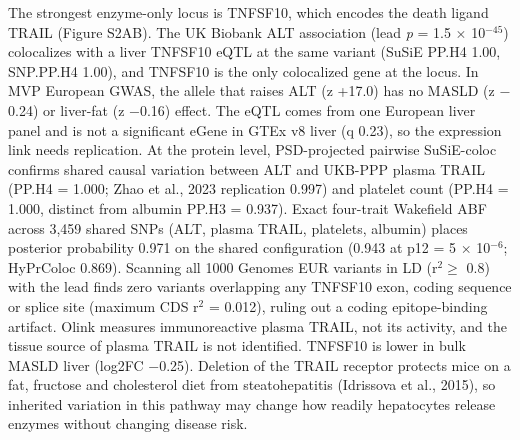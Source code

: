 The strongest enzyme-only locus is TNFSF10, which encodes the death ligand TRAIL (Figure S2AB). The UK Biobank ALT association (lead \emph{p} = 1.5 $\times$ 10$^{-45}$) colocalizes with a liver TNFSF10 eQTL at the same variant (SuSiE PP.H4 1.00, SNP.PP.H4 1.00), and TNFSF10 is the only colocalized gene at the locus. In MVP European GWAS, the allele that raises ALT (z +17.0) has no MASLD (z $-$0.24) or liver-fat (z $-$0.16) effect. The eQTL comes from one European liver panel and is not a significant eGene in GTEx v8 liver (q 0.23), so the expression link needs replication. At the protein level, PSD-projected pairwise SuSiE-coloc confirms shared causal variation between ALT and UKB-PPP plasma TRAIL (PP.H4 = 1.000; Zhao et al., 2023 replication 0.997) and platelet count (PP.H4 = 1.000, distinct from albumin PP.H3 = 0.937). Exact four-trait Wakefield ABF across 3,459 shared SNPs (ALT, plasma TRAIL, platelets, albumin) places posterior probability 0.971 on the shared configuration (0.943 at p12 = 5 $\times$ 10$^{-6}$; HyPrColoc 0.869). Scanning all 1000 Genomes EUR variants in LD (r$^2 \ge$ 0.8) with the lead finds zero variants overlapping any TNFSF10 exon, coding sequence or splice site (maximum CDS r$^2$ = 0.012), ruling out a coding epitope-binding artifact. Olink measures immunoreactive plasma TRAIL, not its activity, and the tissue source of plasma TRAIL is not identified. TNFSF10 is lower in bulk MASLD liver (log2FC $-$0.25). Deletion of the TRAIL receptor protects mice on a fat, fructose and cholesterol diet from steatohepatitis (Idrissova et al., 2015), so inherited variation in this pathway may change how readily hepatocytes release enzymes without changing disease risk.
